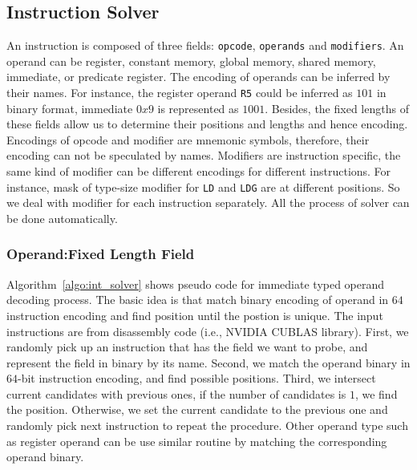\subsection{Instruction Solver}
An instruction is composed of three fields: {\tt opcode}, {\tt operands} and {\tt modifiers}. An operand can be register, constant memory, global memory, shared memory, immediate, or predicate register.
The encoding of operands can be inferred by their names. For instance, the register operand {\tt R5} could be
inferred as $101$ in binary format, immediate $0x9$ is represented as $1001$. Besides, the fixed lengths of these fields allow us to determine their positions and lengths and hence encoding. Encodings of opcode and modifier are mnemonic symbols, therefore, their encoding can not be speculated by names. Modifiers are instruction specific, the same kind of modifier can be different encodings for different instructions. For instance, mask of type-size
modifier for {\tt LD} and {\tt LDG} are at different positions. So we deal with modifier for each instruction separately. All the process of solver can be done automatically.

\subsubsection{Operand:Fixed Length Field}
Algorithm~\ref{algo:int_solver} shows pseudo code for immediate typed operand decoding process. 
The basic idea is that match binary encoding of operand in $64$ instruction encoding and find
position until the postion is unique. The input instructions are from disassembly code (i.e., NVIDIA CUBLAS library).
First, we randomly pick up an instruction that has the field we want to probe, and represent the field in binary by its name. Second, we match the operand binary in $64$-bit instruction encoding, and find possible positions. Third, we intersect current candidates with previous ones, if the number of candidates is $1$, we find the position. Otherwise, we set the current candidate to the previous one and randomly pick next instruction to repeat the procedure.
Other operand type such as register operand can be use similar routine by matching the corresponding operand binary.

